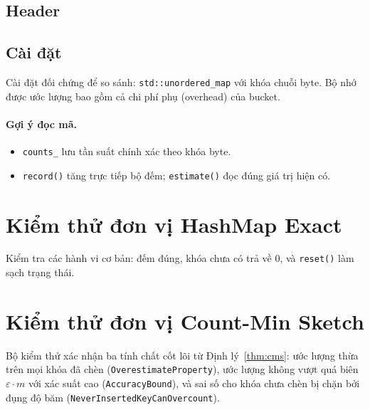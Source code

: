 \subsection{Header}



\subsection{Cài đặt}

Cài đặt đối chứng để so sánh: \texttt{std::unordered\_map} với khóa chuỗi byte. Bộ nhớ được ước lượng bao gồm cả chi phí phụ (overhead) của bucket.



\paragraph{Gợi ý đọc mã.}
\begin{itemize}
    \item \texttt{counts\_} lưu tần suất chính xác theo khóa byte.
    \item \texttt{record()} tăng trực tiếp bộ đếm; \texttt{estimate()} đọc đúng giá trị hiện có.
\end{itemize}

\section{Kiểm thử đơn vị HashMap Exact}

Kiểm tra các hành vi cơ bản: đếm đúng, khóa chưa có trả về 0, và \texttt{reset()} làm sạch trạng thái.



\section{Kiểm thử đơn vị Count-Min Sketch}

Bộ kiểm thử xác nhận ba tính chất cốt lõi từ Định lý~\ref{thm:cms}: ước lượng thừa trên mọi khóa đã chèn (\texttt{OverestimateProperty}), ước lượng không vượt quá biên $\varepsilon \cdot m$ với xác suất cao (\texttt{AccuracyBound}), và sai số cho khóa chưa chèn bị chặn bởi đụng độ băm (\texttt{NeverInsertedKeyCanOvercount}).


